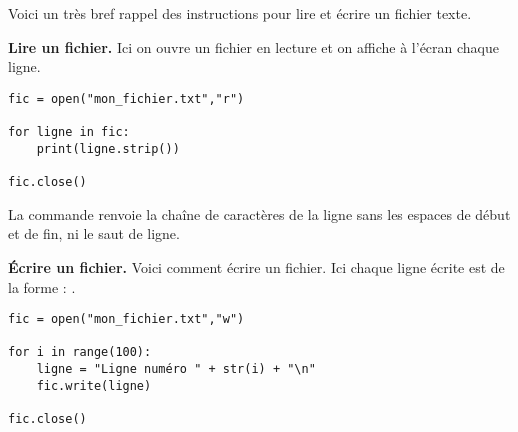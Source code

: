 \documentclass[11pt,class=report,crop=false]{standalone}
\begin{document}
\begin{cours}
	
	
Voici un très bref rappel des instructions \Python{} pour lire et écrire un fichier texte.

\textbf{Lire un fichier.} 
Ici on ouvre un fichier en lecture et on affiche à l'écran chaque ligne.
\begin{lstlisting}
fic = open("mon_fichier.txt","r")

for ligne in fic:
    print(ligne.strip())

fic.close()
\end{lstlisting}

La commande  renvoie la chaîne de caractères de la ligne sans les espaces de début et de fin, ni le saut de ligne. 

\medskip

\textbf{\'Ecrire un fichier.} 
Voici comment écrire un fichier. Ici chaque ligne écrite est de la forme : .
\begin{lstlisting}
fic = open("mon_fichier.txt","w")

for i in range(100):
	ligne = "Ligne numéro " + str(i) + "\n"
	fic.write(ligne)

fic.close()
\end{lstlisting}

\end{cours}



\end{document}
